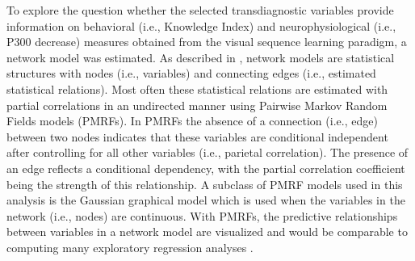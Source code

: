 To explore the question whether the selected transdiagnostic variables provide information on behavioral (i.e., Knowledge Index) and neurophysiological (i.e., P300 decrease) measures obtained from the visual sequence learning paradigm, a network model was estimated. 
As described in \textcite{isvoranuNetworkPsychometricsGuide2022}, network models are statistical structures 
with nodes (i.e., variables) and connecting edges (i.e., estimated statistical relations). Most often these statistical relations are estimated with partial correlations in an undirected manner using Pairwise Markov Random Fields models (PMRFs). In PMRFs the absence of a connection (i.e., edge) between two nodes indicates that these variables are conditional independent after controlling for all other variables (i.e., parietal correlation). The presence of an edge reflects a conditional dependency, with the partial correlation coefficient being the strength of this relationship. A subclass of PMRF models used in this analysis is the Gaussian graphical model \parencite[GGM,][]{lauritzenGraphicalModels1996} which is used when the variables in the network (i.e., nodes) are continuous.
With PMRFs, the predictive relationships between variables in a network model are visualized and would be comparable to computing many exploratory regression analyses \parencite{isvoranuNetworkPsychometricsGuide2022}.  

